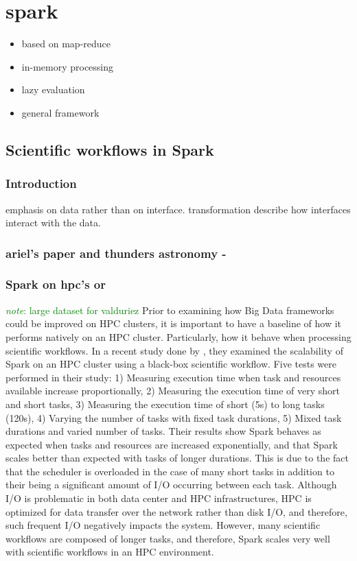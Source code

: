 \documentclass{report}
\newcommand{\note}[1]{\textcolor{green}{\textit{note}: #1}}
\begin{document}
    \section{spark} 
        \begin{itemize} 
            \item based on map-reduce 
            \item in-memory processing 
            \item lazy evaluation 
            \item general framework 
        \end{itemize} 

    \subsection{Scientific workflows in Spark}
        \subsubsection{Introduction}
        emphasis on data rather than on interface. transformation describe how
    interfaces interact with the data. 
        \subsubsection{ariel's paper and thunders astronomy - }
        \subsubsection{Spark on hpc's or } 
            \note{large dataset for valduriez} Prior to
    examining how Big Data frameworks could be improved on HPC clusters, it is
    important to have a baseline of how it performs natively on an HPC cluster.
    Particularly, how it behave when processing scientific workflows. In a recent
    study done by \cite{valduriez}, they examined the scalability of Spark on an HPC
    cluster using a black-box scientific workflow. Five tests were performed in
    their study: 1) Measuring execution time when task and resources available
    increase proportionally, 2) Measuring the execution time of very short and short
    tasks, 3) Measuring the execution time of short (5s) to long tasks (120s), 4)
    Varying the number of tasks with fixed task durations, 5) Mixed task durations
    and varied number of tasks. Their results show Spark behaves as expected when
    tasks and resources are increased exponentially, and that Spark scales better
    than expected with tasks of longer durations. This is due to the fact that the
    scheduler is overloaded in the case of many short tasks in addition to their
    being a significant amount of I/O occurring between each task. Although I/O is
    problematic in both data center and HPC infrastructures, HPC is optimized for
    data transfer over the network rather than disk I/O, and therefore, such
    frequent I/O negatively impacts the system. However, many scientific workflows
    are composed of longer tasks, and therefore, Spark scales very well with
    scientific workflows in an HPC environment.
\end{document}
